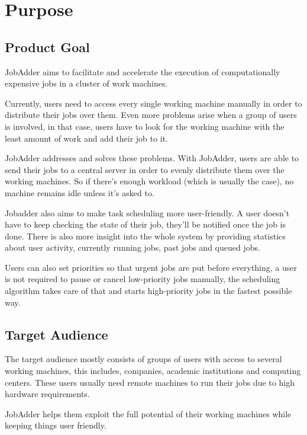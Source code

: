 \section{Purpose}
  \subsection{Product Goal}
    JobAdder aims to facilitate and accelerate the execution of computationally expensive jobs in a cluster of work
    machines.

    Currently, users need to access every single working machine manually in order to distribute their jobs over them.
    Even more problems arise when a group of users is involved, in that case, users have to look for the working machine
    with the least amount of work and add their job to it.
    
    JobAdder addresses and solves these problems. With JobAdder, users are able to send their jobs to a central 
    server in order to evenly distribute them over the working machines. So if there's enough workload (which is usually
    the case), no machine remains idle unless it's asked to.

    Jobadder also aims to make task scheduling more user-friendly. A user doesn't have to keep checking the state of
    their job, they'll be notified once the job is done. There is also more insight into the whole system by 
    providing statistics about user activity, currently running jobs, past jobs and queued jobs.

    Users can also set priorities so that urgent jobs are put before everything, a user is not required to pause or 
    cancel low-priority jobs manually, the scheduling algorithm takes care of that and starts high-priority jobs in the
    fastest possible way.

  \subsection{Target Audience}
    The target audience mostly consists of groups of users with access to several working machines, this includes,
    companies, academic institutions and computing centers. These users usually need remote machines to run their jobs
    due to high hardware requirements.
    
    JobAdder helps them exploit the full potential of their working machines while keeping things user friendly.